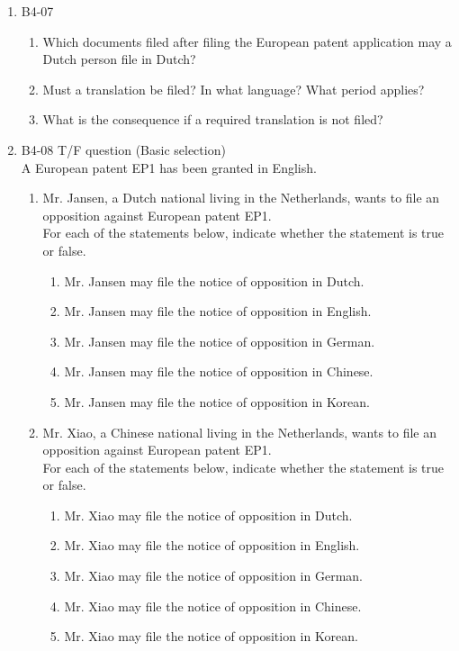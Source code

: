 \documentclass{report}
\begin{document}
\begin{enumerate}[label=\textbf{Question \arabic*}]
\begin{enumerate}[label=\textbf{Question \arabic*}]
    \item %
    B4-07
    \begin{enumerate}[label=(\alph*)]
        \item Which documents filed after filing the European patent application may a Dutch person file in Dutch?
        \item Must a translation be filed? In what language? What period applies?
        \item What is the consequence if a required translation is not filed?
    \end{enumerate}

    \item %
    B4-08 \quad T/F question (Basic selection) \\
    A European patent EP1 has been granted in English.
    
    \begin{enumerate}[label=(\alph*)]
        \item Mr. Jansen, a Dutch national living in the Netherlands, wants to file an opposition against European patent EP1. \\
        For each of the statements below, indicate whether the statement is true or false.
        \begin{enumerate}[label={(\alph{enumi}.\arabic*)}]
            \item Mr. Jansen may file the notice of opposition in Dutch.
            \item Mr. Jansen may file the notice of opposition in English.
            \item Mr. Jansen may file the notice of opposition in German.
            \item Mr. Jansen may file the notice of opposition in Chinese.
            \item Mr. Jansen may file the notice of opposition in Korean.
        \end{enumerate}
        
        \item Mr. Xiao, a Chinese national living in the Netherlands, wants to file an opposition against European patent EP1. \\
        For each of the statements below, indicate whether the statement is true or false.
        \begin{enumerate}[label={(\alph{enumi}.\arabic*)}]
            \item Mr. Xiao may file the notice of opposition in Dutch.
            \item Mr. Xiao may file the notice of opposition in English.
            \item Mr. Xiao may file the notice of opposition in German.
            \item Mr. Xiao may file the notice of opposition in Chinese.
            \item Mr. Xiao may file the notice of opposition in Korean.
        \end{enumerate}
        

\end{enumerate}
\end{enumerate}
\end{enumerate}
\end{document}
